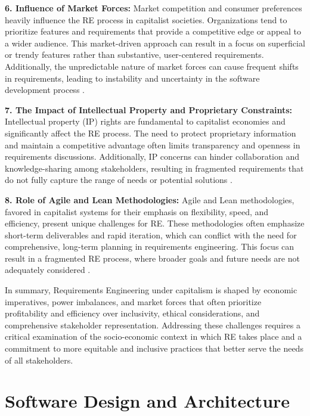 \begin{refsection}
\textbf{6. Influence of Market Forces:} Market competition and consumer preferences heavily influence the RE process in capitalist societies. Organizations tend to prioritize features and requirements that provide a competitive edge or appeal to a wider audience. This market-driven approach can result in a focus on superficial or trendy features rather than substantive, user-centered requirements. Additionally, the unpredictable nature of market forces can cause frequent shifts in requirements, leading to instability and uncertainty in the software development process \cite[pp.~85-105]{benkler2006wealth}.

\textbf{7. The Impact of Intellectual Property and Proprietary Constraints:} Intellectual property (IP) rights are fundamental to capitalist economies and significantly affect the RE process. The need to protect proprietary information and maintain a competitive advantage often limits transparency and openness in requirements discussions. Additionally, IP concerns can hinder collaboration and knowledge-sharing among stakeholders, resulting in fragmented requirements that do not fully capture the range of needs or potential solutions \cite[pp.~37-50]{boldrin2010against}.

\textbf{8. Role of Agile and Lean Methodologies:} Agile and Lean methodologies, favored in capitalist systems for their emphasis on flexibility, speed, and efficiency, present unique challenges for RE. These methodologies often emphasize short-term deliverables and rapid iteration, which can conflict with the need for comprehensive, long-term planning in requirements engineering. This focus can result in a fragmented RE process, where broader goals and future needs are not adequately considered \cite[pp.~205-225]{hoda2018becoming}.

In summary, Requirements Engineering under capitalism is shaped by economic imperatives, power imbalances, and market forces that often prioritize profitability and efficiency over inclusivity, ethical considerations, and comprehensive stakeholder representation. Addressing these challenges requires a critical examination of the socio-economic context in which RE takes place and a commitment to more equitable and inclusive practices that better serve the needs of all stakeholders.

\section{Software Design and Architecture}


\end{refsection}
